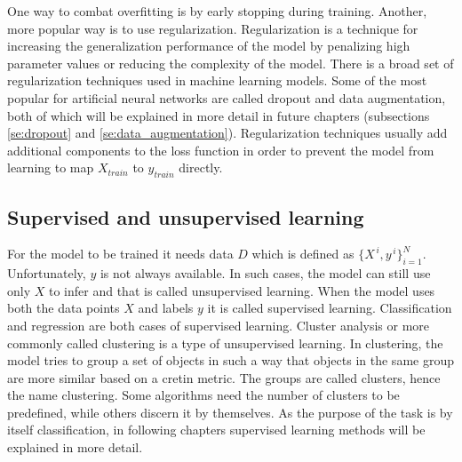\documentclass[times, utf8, diplomski]{fer}
\begin{document}
One way to combat overfitting is by early stopping during training. Another, more popular way is to use regularization. Regularization is a technique for increasing the generalization performance of the model by penalizing high parameter values or reducing the complexity of the model. There is a broad set of regularization techniques used in machine learning models. Some of the most popular for artificial neural networks are called dropout \citep{srivastava_dropout:_2014} and data augmentation, both of which will be explained in more detail in future chapters (subsections \ref{se:dropout} and \ref{se:data_augmentation}). Regularization techniques usually add additional components to the loss function in order to prevent the model from learning to map $X_{train}$ to $y_{train}$ directly.


\subsection{Supervised and unsupervised learning}
For the model to be trained it needs data $D$ which is defined as $\{{X}^{\,i},y^{\,i}\}^{N}_{i=1}$. Unfortunately, $y$ is not always available. In such cases, the model can still use only $X$ to infer and that is called unsupervised learning. When the model uses both the data points $X$ and labels $y$ it is called supervised learning. Classification and regression are both cases of supervised learning. Cluster analysis or more commonly called clustering is a type of unsupervised learning. In clustering, the model tries to group a set of objects in such a way that objects in the same group are more similar based on a cretin metric. The groups are called clusters, hence the name clustering. Some algorithms need the number of clusters to be predefined, while others discern it by themselves. As the purpose of the task is by itself classification, in following chapters supervised learning methods will be explained in more detail.
\end{document}

